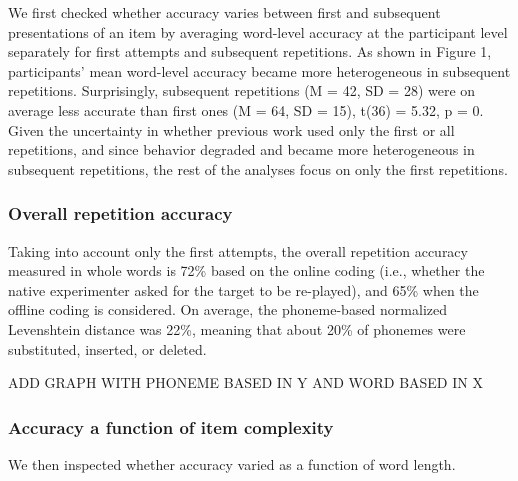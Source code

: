 \documentclass[english,,man]{apa6}
\begin{document}
We first checked whether accuracy varies between first and subsequent presentations of an item by averaging word-level accuracy at the participant level separately for first attempts and subsequent repetitions. As shown in Figure 1, participants' mean word-level accuracy became more heterogeneous in subsequent repetitions. Surprisingly, subsequent repetitions (M = 42, SD = 28)
were on average less accurate than first ones (M = 64, SD = 15), t(36) = 5.32, p = 0. Given the uncertainty in whether previous work used only the first or all repetitions, and since behavior degraded and became more heterogeneous in subsequent repetitions, the rest of the analyses focus on only the first repetitions.

\hypertarget{overall-repetition-accuracy}{%
\subsubsection{Overall repetition accuracy}\label{overall-repetition-accuracy}}

Taking into account only the first attempts, the overall repetition accuracy measured in whole words is 72\% based on the online coding (i.e., whether the native experimenter asked for the target to be re-played), and 65\% when the offline coding is considered. On average, the phoneme-based normalized Levenshtein distance was 22\%, meaning that about 20\% of phonemes were substituted, inserted, or deleted.

ADD GRAPH WITH PHONEME BASED IN Y AND WORD BASED IN X

\hypertarget{accuracy-a-function-of-item-complexity}{%
\subsubsection{Accuracy a function of item complexity}\label{accuracy-a-function-of-item-complexity}}

We then inspected whether accuracy varied as a function of word length.
\end{document}
